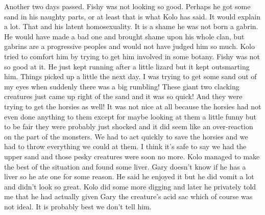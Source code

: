 Another two days passed. Fishy was not looking so good. Perhaps he got some sand in his naughty parts, or at least that is what Kolo has said. It would explain a lot. That and his latent homosexuality. It is a shame he was not born a gabrin. He would have made a bad one and brought shame upon his whole clan, but gabrins are a progressive peoples and would not have judged him so much. Kolo tried to comfort him by trying to get him involved in some botany. Fishy was not so good at it. He just kept running after a little lizard but it kept outsmarting him. Things picked up a little the next day. I was trying to get some sand out of my eyes when suddenly there was a big rumbling! These giant two clacking creatures just came up right of the sand and it was so quick! And they were trying to get the horsies as well! It was not nice at all because the horsies had not even done anything to them except for maybe looking at them a little funny but to be fair they were probably just shocked and it did seem like an over-reaction on the part of the monsters. We had to act quickly to save the horsies and we had to throw everything we could at them. I think it’s safe to say we had the upper sand and those pesky creatures were soon no more. Kolo managed to make the best of the situation and found some liver. Gary doesn’t know if he has a liver so he ate one for some reason. He said he enjoyed it but he did vomit a lot and didn’t look so great. Kolo did some more digging and later he privately told me that he had actually given Gary the creature’s acid sac which of course was not ideal. It is probably best we don’t tell him.\medskip

